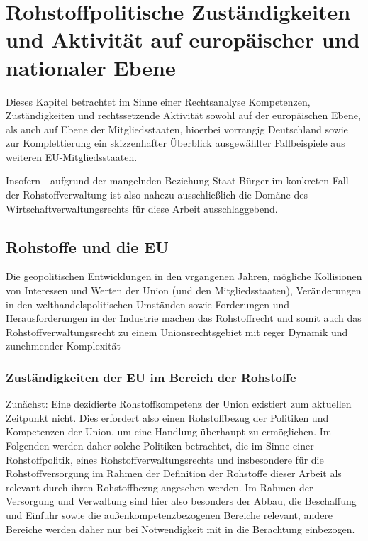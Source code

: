 \documentclass[12pt,a4paper,oneside]{book} %
\begin{document}
	
\chapter{Rohstoffpolitische Zuständigkeiten und Aktivität auf europäischer und nationaler Ebene}

Dieses Kapitel betrachtet im Sinne einer Rechtsanalyse Kompetenzen, Zuständigkeiten und rechtssetzende Aktivität sowohl auf der europäischen Ebene, als auch auf Ebene der Mitgliedsstaaten, hioerbei vorrangig Deutschland sowie zur Komplettierung ein skizzenhafter Überblick ausgewählter Fallbeispiele aus weiteren EU-Mitgliedsstaaten.	
	
	
	Insofern - aufgrund der mangelnden Beziehung Staat-Bürger im konkreten Fall der Rohstoffverwaltung ist also nahezu ausschließlich die Domäne des Wirtschaftverwaltungsrechts für diese Arbeit ausschlaggebend.
	
	\section{Rohstoffe und die EU}
	
	Die geopolitischen Entwicklungen in den vrgangenen Jahren, mögliche Kollisionen von Interessen und Werten der Union (und den Mitgliedsstaaten), Veränderungen in den welthandelspolitischen Umständen sowie Forderungen und Herausforderungen in der Industrie machen das Rohstoffrecht und somit auch das Rohstoffverwaltungsrecht zu einem Unionsrechtsgebiet mit reger Dynamik und zunehmender Komplexität
	\subsection{Zuständigkeiten der EU im Bereich der Rohstoffe}
	
	Zunächst: Eine dezidierte Rohstoffkompetenz der Union existiert zum aktuellen Zeitpunkt nicht. Dies erfordert also einen Rohstoffbezug der Politiken und Kompetenzen der Union, um eine Handlung überhaupt zu ermöglichen. Im Folgenden werden daher solche Politiken betrachtet, die im Sinne einer Rohstoffpolitik, eines Rohstoffverwaltungsrechts und insbesondere für die Rohstoffversorgung im Rahmen der Definition der Rohstoffe dieser Arbeit als relevant durch ihren Rohstoffbezug angesehen werden. Im Rahmen der Versorgung und Verwaltung sind hier also besonders der Abbau, die Beschaffung und Einfuhr sowie die außenkompetenzbezogenen Bereiche relevant, andere Bereiche werden daher nur bei Notwendigkeit mit in die Berachtung einbezogen.
	
\end{document}
